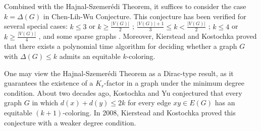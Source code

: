 \documentclass[11pt, a4paper]{article}
\theoremstyle{definition}
\newcommand{\<}{\subseteq}
\begin{document}
Combined with the Hajnal-Szemer\'{e}di Theorem, it suffices to consider the case $k=\Delta(G)$ in Chen-Lih-Wu Conjecture. %
This conjecture has been verified for several special cases: $k\leq 3$ or $k\geq \frac{|V(G)|}{2}$ \cite{CLW1994}; $\frac{|V(G)|+1}{3}\leq k<\frac{|V(G)|}{2}$ \cite{chenhuang}; $k\leq 4$ or $k\geq \frac{|V(G)|}{4}$ \cite{KK2012,KK2015}, and 
some sparse graphs \cite{cly,KLX2024,LZ2024,Na2004,Na2012,YZ1997,Zh2016,YZ1998}. Moreover, Kierstead and Kostochka \cite{KK-algo} proved that there exists a polynomial time algorithm for deciding whether a graph $G$
 with $\Delta(G)\leq k$ admits an equitable  $k$-coloring.


One may view the Hajnal-Szemer\'{e}di Theorem as a Dirac-type result, as it guarantees the existence of a $K_r$-factor in a graph under  the minimum degree condition. %
About two decades ago, Kostochka and Yu \cite{KY2007} conjectured that every graph $G$ in which $d(x)+d(y)\le 2k$ for every edge $xy\in E(G)$ has an equitable $(k+1)$-coloring. In 2008, Kierstead and Kostochka \cite{KK2008} proved this conjecture with a weaker degree condition. %
\end{document}

